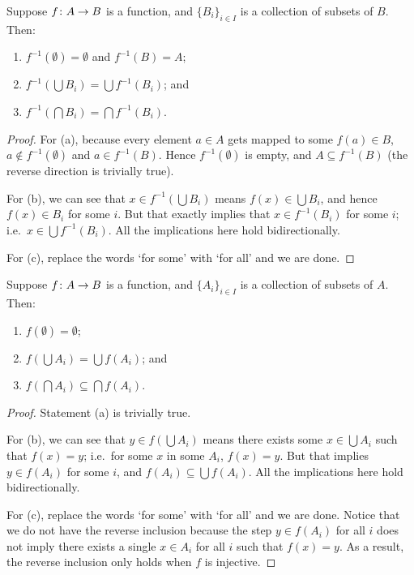\begin{proposition}
    Suppose \(f\colon A\to B\) is a function, and \({\{B_i\}}_{i \in I}\) is a collection of subsets of \(B\).
    Then:
    \begin{enumerate}[label={(\alph*)}, itemsep=0mm]
        \item \(f^{-1}(\emptyset) = \emptyset\) and \(f^{-1}(B) = A\);
        \item \(f^{-1}(\bigcup B_i) = \bigcup f^{-1}(B_i)\); and
        \item \(f^{-1}(\bigcap B_i) = \bigcap f^{-1}(B_i)\).
    \end{enumerate} 
\end{proposition}
\begin{proof}
    For (a), because every element \(a \in A\) gets mapped to some \(f(a) \in B\),
    \(a \notin f^{-1}(\emptyset)\) and \(a \in f^{-1}(B)\).
    Hence \(f^{-1}(\emptyset)\) is empty, and \(A \subseteq f^{-1}(B)\) (the reverse direction is trivially true).

    For (b), we can see that \(x \in f^{-1}(\bigcup B_i)\)
    means \(f(x) \in \bigcup B_i\), and hence \(f(x) \in B_i\) for some \(i\).
    But that exactly implies that \(x \in f^{-1}(B_i)\) for some \(i\);
    i.e.\ \(x \in \bigcup f^{-1}(B_i)\).
    All the implications here hold bidirectionally.

    For (c), replace the words `for some' with `for all' and we are done.
\end{proof}
\begin{proposition}
    Suppose \(f\colon A\to B\) is a function, and \({\{A_i\}}_{i \in I}\) is a collection of subsets of \(A\).
    Then:
    \begin{enumerate}[label={(\alph*)}, itemsep=0mm]
        \item \(f(\emptyset) = \emptyset\);
        \item \(f(\bigcup A_i) = \bigcup f(A_i)\); and
        \item \(f(\bigcap A_i) \subseteq \bigcap f(A_i)\).
    \end{enumerate} 
\end{proposition}
\begin{proof}
    Statement (a) is trivially true.

    For (b), we can see that \(y \in f(\bigcup A_i)\)
    means there exists some \(x \in \bigcup A_i\) such that \(f(x) = y\);
    i.e.\ for some \(x\) in some \(A_i\), \(f(x) = y\).
    But that implies \(y \in f(A_i)\) for some \(i\), and \(f(A_i) \subseteq \bigcup f(A_i)\).
    All the implications here hold bidirectionally.

    For (c), replace the words `for some' with `for all' and we are done.
    Notice that we do not have the reverse inclusion
    because the step \(y \in f(A_i)\) for all \(i\)
    does not imply there exists a single \(x \in A_i\) for all \(i\) such that \(f(x) = y\).
    As a result, the reverse inclusion only holds when \(f\) is injective.
\end{proof}


